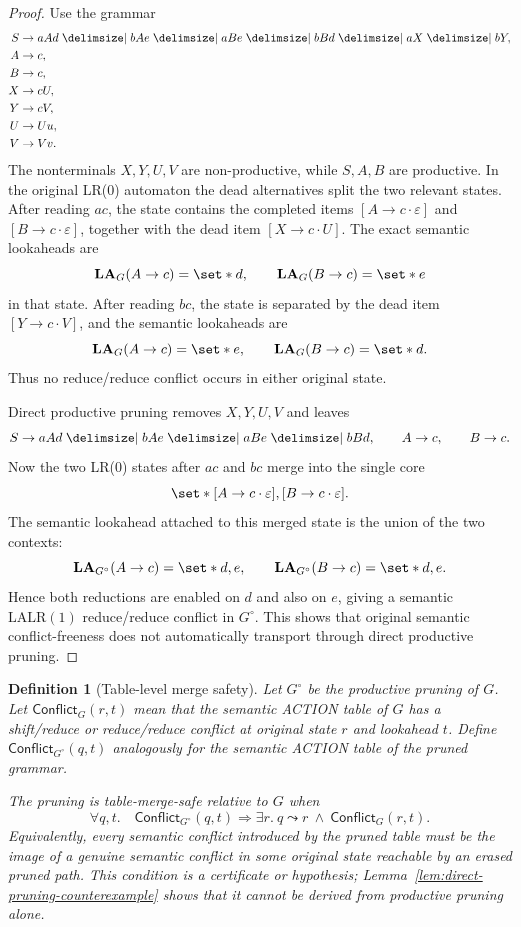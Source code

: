 \documentclass[11pt,a4paper]{article}
\theoremstyle{prettyplain}
\theoremstyle{prettydef}
\newtheorem{definition}[theorem]{Definition}
\def\mid{\;\delimsize\vert\;}#1%
\newcommand{\eps}{\varepsilon}
\newcommand{\LALRone}{\mathrm{LALR(1)}}
\newcommand{\Item}[2]{[#1\to #2]}
\newcommand{\Look}{\mathbf{LA}}
\begin{document}
\begin{proof}
Use the grammar
\[
\begin{aligned}
S&\to aAd\mid bAe\mid aBe\mid bBd\mid aX\mid bY,\\
A&\to c,\\
B&\to c,\\
X&\to cU,\\
Y&\to cV,\\
U&\to Uu,\\
V&\to Vv.
\end{aligned}
\]
The nonterminals \(X,Y,U,V\) are non-productive, while \(S,A,B\) are productive.
In the original LR(0) automaton the dead alternatives split the two relevant
states.  After reading \(ac\), the state contains the completed items
\(\Item{A}{c\cdot\eps}\) and \(\Item{B}{c\cdot\eps}\), together with the dead
item \(\Item{X}{c\cdot U}\).  The exact semantic lookaheads are
\[
\Look_G(A\to c)=\set*{d},
\qquad
\Look_G(B\to c)=\set*{e}
\]
in that state.  After reading \(bc\), the state is separated by the dead item
\(\Item{Y}{c\cdot V}\), and the semantic lookaheads are
\[
\Look_G(A\to c)=\set*{e},
\qquad
\Look_G(B\to c)=\set*{d}.
\]
Thus no reduce/reduce conflict occurs in either original state.

Direct productive pruning removes \(X,Y,U,V\) and leaves
\[
S\to aAd\mid bAe\mid aBe\mid bBd,
\qquad
A\to c,
\qquad
B\to c.
\]
Now the two LR(0) states after \(ac\) and \(bc\) merge into the single core
\[
\set*{\Item{A}{c\cdot\eps},\Item{B}{c\cdot\eps}}.
\]
The semantic lookahead attached to this merged state is the union of the two
contexts:
\[
\Look_{G^\circ}(A\to c)=\set*{d,e},
\qquad
\Look_{G^\circ}(B\to c)=\set*{d,e}.
\]
Hence both reductions are enabled on \(d\) and also on \(e\), giving a semantic
\(\LALRone\) reduce/reduce conflict in \(G^\circ\).  This shows that original
semantic conflict-freeness does not automatically transport through direct
productive pruning.
\end{proof}

\begin{definition}[Table-level merge safety]
\label{def:table-merge-safety}
Let \(G^\circ\) be the productive pruning of \(G\).  Let
\(\mathsf{Conflict}_{G}(r,t)\) mean that the semantic ACTION table of \(G\) has a
shift/reduce or reduce/reduce conflict at original state \(r\) and lookahead
\(t\).  Define \(\mathsf{Conflict}_{G^\circ}(q,t)\) analogously for the semantic
ACTION table of the pruned grammar.

The pruning is \emph{table-merge-safe relative to \(G\)} when
\[
\forall q,t.
\quad
\mathsf{Conflict}_{G^\circ}(q,t)
\Longrightarrow
\exists r.\ q\leadsto r\ \wedge\ \mathsf{Conflict}_{G}(r,t).
\]
Equivalently, every semantic conflict introduced by the pruned table must be the
image of a genuine semantic conflict in some original state reachable by an
erased pruned path.  This condition is a certificate or hypothesis; Lemma~\ref{lem:direct-pruning-counterexample}
shows that it cannot be derived from productive pruning alone.
\end{definition}
\end{document}
